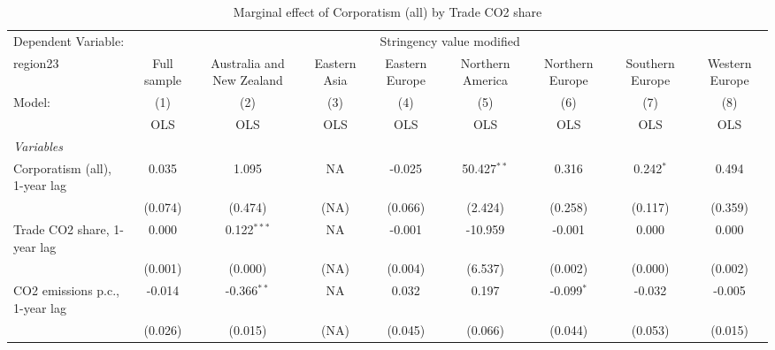 
\begin{table}[htbp]
   \caption{Marginal effect of Corporatism (all) by Trade CO2 share}
   \centering
   \begin{tabular}{lcccccccc}
      \toprule
      Dependent Variable: & \multicolumn{8}{c}{Stringency value modified}\\
      region23                                                    & Full sample   & Australia and New Zealand & Eastern Asia & Eastern Europe & Northern America & Northern Europe & Southern Europe & Western Europe \\   
      Model:                                                      & (1)           & (2)                       & (3)          & (4)            & (5)              & (6)             & (7)             & (8)\\  
                                                                  &  OLS          & OLS                       & OLS          & OLS            & OLS              & OLS             & OLS             & OLS\\  
      \midrule
      \emph{Variables}\\
      Corporatism (all), 1-year lag                               & 0.035         & 1.095                     & NA           & -0.025         & 50.427$^{**}$    & 0.316           & 0.242$^{*}$     & 0.494\\   
                                                                  & (0.074)       & (0.474)                   & (NA)         & (0.066)        & (2.424)          & (0.258)         & (0.117)         & (0.359)\\   
      Trade CO2 share, 1-year lag                                 & 0.000         & 0.122$^{***}$             & NA           & -0.001         & -10.959          & -0.001          & 0.000           & 0.000\\   
                                                                  & (0.001)       & (0.000)                   & (NA)         & (0.004)        & (6.537)          & (0.002)         & (0.000)         & (0.002)\\   
      CO2 emissions p.c., 1-year lag                              & -0.014        & -0.366$^{**}$             & NA           & 0.032          & 0.197            & -0.099$^{*}$    & -0.032          & -0.005\\   
                                                                  & (0.026)       & (0.015)                   & (NA)         & (0.045)        & (0.066)          & (0.044)         & (0.053)         & (0.015)\\   

\end{tabular}
\end{table}
